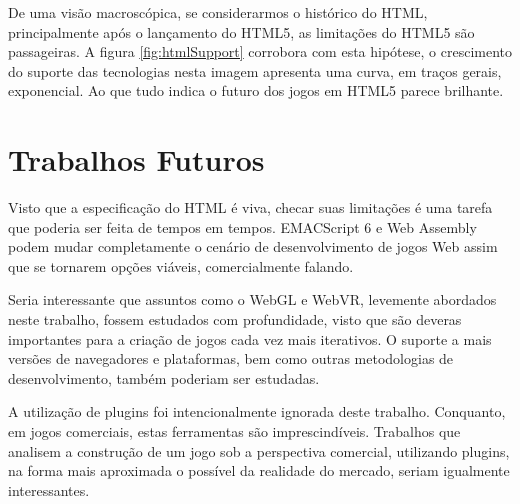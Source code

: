 De uma visão macroscópica, se considerarmos o histórico do HTML,
principalmente após o lançamento do HTML5, as limitações do HTML5
são passageiras. A figura \ref{fig:htmlSupport} corrobora com esta
hipótese, o crescimento do suporte das tecnologias nesta imagem
apresenta uma curva, em traços gerais, exponencial. Ao que tudo indica
o futuro dos jogos em HTML5 parece brilhante.

\section{Trabalhos Futuros}

Visto que a especificação do HTML é viva, checar suas limitações
é uma tarefa que poderia ser feita de tempos em tempos. EMACScript 6
e Web Assembly podem mudar completamente o cenário de desenvolvimento
de jogos Web assim que se tornarem opções viáveis, comercialmente
falando.

Seria interessante que assuntos como o WebGL e WebVR, levemente
abordados neste trabalho, fossem estudados com profundidade, visto que
são deveras importantes para a criação de jogos cada vez mais
iterativos. O suporte a mais versões de navegadores e plataformas,
bem como outras metodologias de desenvolvimento, também poderiam ser
estudadas.

A utilização de plugins foi intencionalmente ignorada deste
trabalho. Conquanto, em jogos comerciais, estas ferramentas são
imprescindíveis. Trabalhos que analisem a construção de um jogo sob
a perspectiva comercial, utilizando plugins, na forma mais aproximada
o possível da realidade do mercado, seriam igualmente interessantes.
